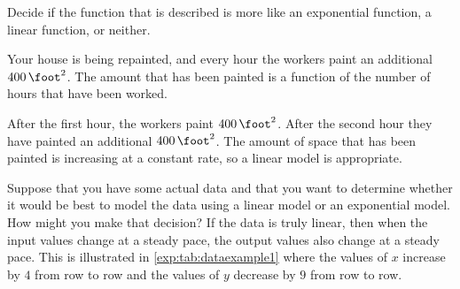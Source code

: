 \begin{pccexample}
	Decide if the function that is described is more like an exponential function, a linear function, or neither.
										
	Your house is being repainted, and every hour the workers paint an additional $\SI{400}{\square\foot}$.  
	The amount that has been painted is a function of the number of hours that have been worked.
										
	\begin{pccsolution}
		After the first hour, the workers paint $\SI{400}{\square\foot}$.  After the second hour they have painted an additional 
		$\SI{400}{\square\foot}$.  The amount of space that has been painted is increasing at a constant rate, so a linear model is appropriate.
	\end{pccsolution}
\end{pccexample}
			
Suppose that you have some actual data and that you want to determine whether it would be 
best to model the data using a linear model or an exponential model.  How might you make 
that decision? If the data is truly linear, then when the input values change at a 
steady pace, the output values also change at a steady pace.  This is illustrated 
in \cref{exp:tab:dataexample1} where the values of $x$ increase by $4$ from row to row 
and the values of $y$ decrease by $9$ from row to row.
			
